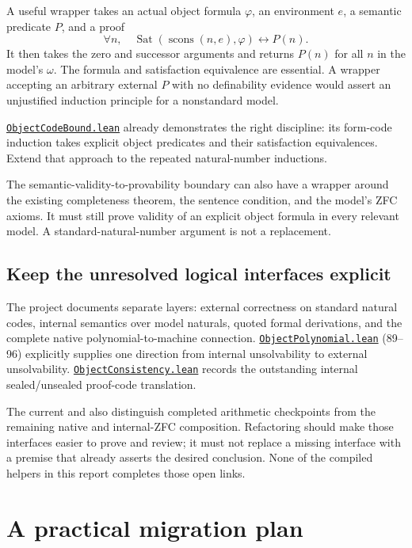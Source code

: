 \documentclass[11pt,letterpaper]{article}
\newcommand{\SourceBase}{https://github.com/VladimirReshetnikov/ProveIt/blob/60e9c5d620c6c387d932876cfa2d9376f64ea56c/Computability/DiophantineConsistency}
\newcommand{\module}[1]{\href{\SourceBase/Lean/DiophantineConsistency/#1.lean}{\texttt{#1.lean}}}
\newcommand{\docsource}[1]{\href{\SourceBase/#1}{\texttt{\detokenize{#1}}}}
\begin{document}
A useful wrapper takes an actual object formula $\varphi$, an environment $e$, a semantic predicate $P$, and a proof
\[
 \forall n,\quad \operatorname{Sat}(\operatorname{scons}(n,e),\varphi)
 \longleftrightarrow P(n).
\]
It then takes the zero and successor arguments and returns $P(n)$ for all $n$ in the model's $\omega$. The formula and satisfaction equivalence are essential. A wrapper accepting an arbitrary external $P$ with no definability evidence would assert an unjustified induction principle for a nonstandard model.

\module{ObjectCodeBound} already demonstrates the right discipline: its form-code induction takes explicit object predicates and their satisfaction equivalences. Extend that approach to the repeated natural-number inductions.

The semantic-validity-to-provability boundary can also have a wrapper around the existing completeness theorem, the sentence condition, and the model's ZFC axioms. It must still prove validity of an explicit object formula in every relevant model. A standard-natural-number argument is not a replacement.

\subsection{Keep the unresolved logical interfaces explicit}

The project documents separate layers: external correctness on standard natural codes, internal semantics over model naturals, quoted formal derivations, and the complete native polynomial-to-machine connection. \module{ObjectPolynomial} (89--96) explicitly supplies one direction from internal unsolvability to external unsolvability. \module{ObjectConsistency} records the outstanding internal sealed/unsealed proof-code translation.

The current \docsource{README.md} and \docsource{LEAN_EQUIVALENCE_PLAN.md} also distinguish completed arithmetic checkpoints from the remaining native and internal-ZFC composition. Refactoring should make those interfaces easier to prove and review; it must not replace a missing interface with a premise that already asserts the desired conclusion. None of the compiled helpers in this report completes those open links.

\section{A practical migration plan}
\end{document}
